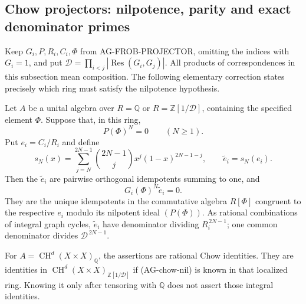 \subsection{Chow projectors: nilpotence, parity and exact denominator primes}

Keep $G_i,P,R_i,C_i,\Phi$ from AG-FROB-PROJECTOR, omitting
the indices with $G_i=1$, and put
$\mathcal D=\prod_{i<j}|\operatorname{Res}(G_i,G_j)|$.
All products of correspondences in this subsection mean
composition.  The following elementary correction states
precisely which ring must satisfy the nilpotence hypothesis.

\begin{proposition}
Let $A$ be a unital algebra over
$R=\mathbb Q$ or $R=\mathbb Z[1/\mathcal D]$, containing
the specified element $\Phi$.  Suppose that, in this ring,
\[
                         P(\Phi)^N=0\qquad(N\ge1).
\tag{AG-chow-nil}
\]
Put $e_i=C_i/R_i$ and define
\[
 s_N(x)=\sum_{j=N}^{2N-1}
             {2N-1\choose j}x^j(1-x)^{2N-1-j},
                   \qquad \widetilde e_i=s_N(e_i).
\tag{AG-chow-correction}
\]
Then the $\widetilde e_i$ are pairwise orthogonal
idempotents summing to one, and
\[
                 G_i(\Phi)^N\widetilde e_i=0.
\tag{AG-chow-primary}
\]
They are the unique idempotents in the commutative
algebra $R[\Phi]$ congruent to the respective $e_i$
modulo its nilpotent ideal $(P(\Phi))$.
As rational combinations of integral graph cycles,
$\widetilde e_i$ have denominator dividing
$R_i^{\,2N-1}$; one common denominator divides
$\mathcal D^{\,2N-1}$.

For $A=\operatorname{CH}^d(X\times X)_{\mathbb Q}$,
the assertions are rational Chow identities.  They
are identities in
$\operatorname{CH}^d(X\times X)_{\mathbb Z[1/\mathcal D]}$
if (AG-chow-nil) is known in that localized ring.
Knowing it only after tensoring with $\mathbb Q$
does not assert those integral identities.
\end{proposition}
